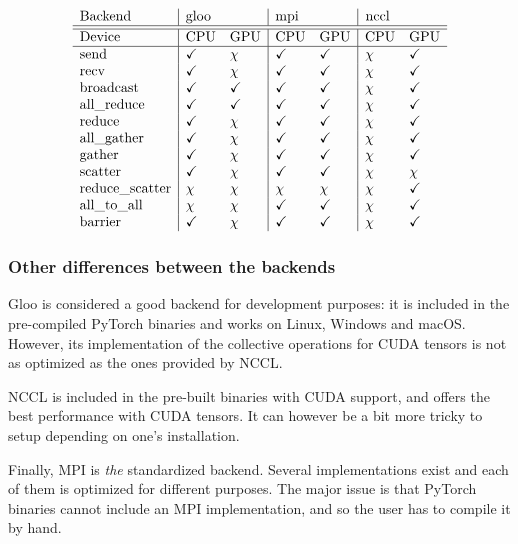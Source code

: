 \documentclass{article}
\begin{document}
\[\begin{array}{l|ll|ll|ll}
  \text{Backend} & \text{\lstinline{gloo}} & & \text{\lstinline{mpi}} & & \text{\lstinline{nccl}} \\
  \hline\hline
  \text{Device} & \text{CPU} & \text{GPU} & \text{CPU} & \text{GPU} & \text{CPU} & \text{GPU} \\
  \hline
  \text{send} & \checkmark & \chi & \checkmark & \checkmark & \chi & \checkmark \\
  \text{recv} & \checkmark & \chi & \checkmark & \checkmark & \chi & \checkmark \\
  \text{broadcast} & \checkmark & \checkmark & \checkmark & \checkmark & \chi & \checkmark \\
  \text{all\_reduce} & \checkmark & \checkmark & \checkmark & \checkmark & \chi & \checkmark \\
  \text{reduce} & \checkmark & \chi & \checkmark & \checkmark & \chi & \checkmark \\
  \text{all\_gather} & \checkmark & \chi & \checkmark & \checkmark & \chi & \checkmark \\
  \text{gather} & \checkmark & \chi & \checkmark & \checkmark & \chi & \checkmark \\
  \text{scatter} & \checkmark & \chi & \checkmark & \checkmark & \chi & \chi \\
  \text{reduce\_scatter} & \chi & \chi & \chi & \chi & \chi & \checkmark \\
  \text{all\_to\_all} & \chi & \chi & \checkmark & \checkmark & \chi & \checkmark \\
  \text{barrier} & \checkmark & \chi & \checkmark & \checkmark & \chi & \checkmark
\end{array}\]

\subsubsection{Other differences between the backends}
Gloo is considered a good backend for development purposes: it is included in the pre-compiled PyTorch binaries and works on Linux, Windows and macOS. However, its implementation of the collective operations for CUDA tensors is not as optimized as the ones provided by NCCL.

NCCL is included in the pre-built binaries with CUDA support, and offers the best performance with CUDA tensors. It can however be a bit more tricky to setup depending on one's installation.

Finally, MPI is \textit{the} standardized backend. Several implementations exist and each of them is optimized for different purposes. The major issue is that PyTorch binaries cannot include an MPI implementation, and so the user has to compile it by hand. %
\end{document}

